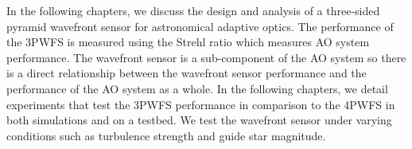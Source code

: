 In the following chapters, we discuss the design and analysis of a three-sided pyramid wavefront sensor for astronomical adaptive optics. The performance of the 3PWFS is measured using the Strehl ratio which measures AO system performance. The wavefront sensor is a sub-component of the AO system so there is a direct relationship between the wavefront sensor performance and the performance of the AO system as a whole. In the following chapters, we detail experiments that test the 3PWFS performance in comparison to the 4PWFS in both simulations and on a testbed. We test the wavefront sensor under varying conditions such as turbulence strength and guide star magnitude.






